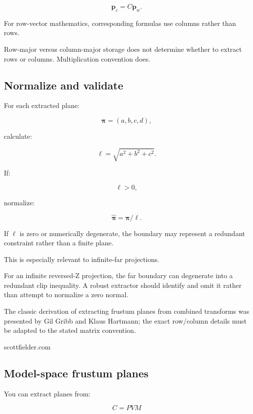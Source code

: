 \[
 \mathbf p_c=C\mathbf p_w.
\]

For row-vector mathematics, corresponding formulas use columns rather than rows.

Row-major versus column-major storage does not determine whether to extract rows or columns. Multiplication convention does.

\subsection{Normalize and validate}\label{02-foundations-ii-ch034-normalize-and-validate}

\hypertarget{02-foundations-ii-ch034-normalize-and-validate}{}

For each extracted plane:

\[
 \boldsymbol\pi=(a,b,c,d),
\]

calculate:

\[
 \ell=\sqrt{a^2+b^2+c^2}.
\]

If:

\[
 \ell>0,
\]

normalize:

\[
 \boxed{ \hat{\boldsymbol\pi}=\boldsymbol\pi/\ell }.
\]

If \(\ell\) is zero or numerically degenerate, the boundary may represent a redundant constraint rather than a finite plane.

This is especially relevant to infinite-far projections.

For an infinite reversed-Z projection, the far boundary can degenerate into a redundant clip inequality. A robust extractor should identify and omit it rather than attempt to normalize a zero normal.

The classic derivation of extracting frustum planes from combined transforms was presented by Gil Gribb and Klaus Hartmann; the exact row/column details must be adapted to the stated matrix convention. 

scottfielder.com

\subsection{Model-space frustum planes}\label{02-foundations-ii-ch034-model-space-frustum-planes}

\hypertarget{02-foundations-ii-ch034-model-space-frustum-planes}{}

You can extract planes from:

\[
 C=PVM
\]

